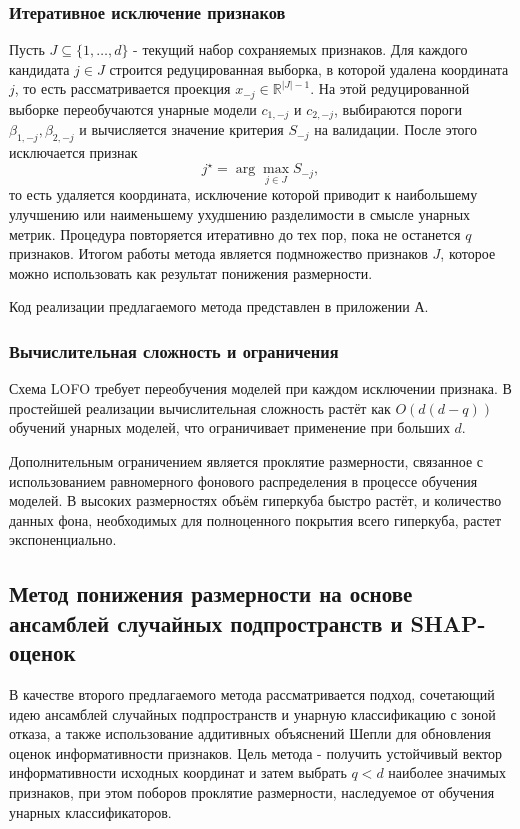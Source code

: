 \documentclass[12pt,a4paper]{article}
\begin{document}
\subsubsection{Итеративное исключение признаков}
Пусть $J\subseteq\{1,\dots,d\}$ - текущий набор сохраняемых признаков.
Для каждого кандидата $j\in J$ строится редуцированная выборка, в которой удалена координата $j$,
то есть рассматривается проекция $x_{-j}\in\mathbb{R}^{|J|-1}$. На этой редуцированной выборке
переобучаются унарные модели $c_{1,-j}$ и $c_{2,-j}$, выбираются пороги $\beta_{1,-j},\beta_{2,-j}$
и вычисляется значение критерия $S_{-j}$ на валидации.
После этого исключается признак
\begin{equation}
j^\star = \arg\max_{j\in J} S_{-j},
\end{equation}
то есть удаляется координата, исключение которой приводит к наибольшему улучшению или наименьшему ухудшению разделимости в смысле унарных метрик. Процедура повторяется итеративно до тех пор,
пока не останется $q$ признаков. Итогом работы метода является подмножество признаков $J$,
которое можно использовать как результат понижения размерности.

Код реализации предлагаемого метода представлен в приложении А.

\subsubsection{Вычислительная сложность и ограничения}
Схема LOFO требует переобучения моделей при каждом исключении признака.
В простейшей реализации вычислительная сложность растёт как $O(d(d-q))$ обучений унарных моделей,
что ограничивает применение при больших $d$.

Дополнительным ограничением является проклятие размерности, связанное с использованием
равномерного фонового распределения в процессе обучения моделей. В высоких размерностях объём гиперкуба быстро растёт,
и количество данных фона, необходимых для полноценного покрытия всего гиперкуба, растет экспоненциально.

\subsection{Метод понижения размерности на основе ансамблей случайных подпространств и SHAP-оценок}

В качестве второго предлагаемого метода рассматривается подход, сочетающий идею ансамблей
случайных подпространств и унарную классификацию с зоной отказа, а также использование
аддитивных объяснений Шепли для обновления оценок информативности признаков.
Цель метода - получить устойчивый вектор информативности исходных координат и затем выбрать
$q<d$ наиболее значимых признаков, при этом поборов проклятие размерности, наследуемое от обучения унарных классификаторов.
\end{document}
